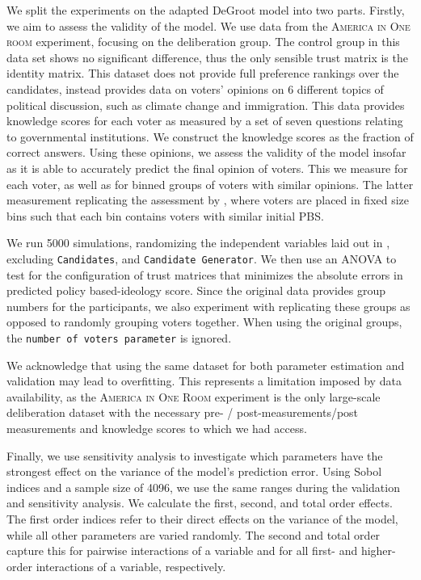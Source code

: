 We split the experiments on the adapted DeGroot model into two parts. Firstly,
we aim to assess the validity of the model. We use data from the
\textsc{America in One room} experiment, focusing on the deliberation group.
The control group in this data set shows no significant difference, thus the
only sensible trust matrix is the identity matrix. This dataset does not
provide full preference rankings over the candidates, instead provides data on
voters' opinions on 6 different topics of political discussion, such as climate
change and immigration. This data provides knowledge scores for each voter as
measured by a set of seven questions relating to governmental institutions. We
construct the knowledge scores as the fraction of correct answers. Using these
opinions, we assess the validity of the model insofar as it is able to
accurately predict the final opinion of voters. This we measure for each voter,
as well as for binned groups of voters with similar opinions. The latter
measurement replicating the assessment by
\citet{fishkinCanDeliberationHave2024}, where voters are placed in fixed size bins such that each bin contains voters with similar initial PBS.

We run 5000 simulations, randomizing the independent variables laid out in
, excluding \texttt{Candidates}, and
\texttt{Candidate Generator}. We then use an ANOVA to test for the
configuration of trust matrices that minimizes the absolute errors in predicted
policy based-ideology score. Since the original data provides group numbers for
the participants, we also experiment with
replicating these groups as opposed to randomly grouping voters together. When
using the original groups, the \texttt{number of voters parameter} is ignored.

We acknowledge that using the same dataset for both parameter estimation and
validation may lead to overfitting. This represents a limitation imposed by
data availability, as the \textsc{America in One Room} experiment is the only
large-scale deliberation dataset with the necessary pre- / post-measurements/post measurements and
knowledge scores to which we had access.





Finally, we use sensitivity analysis to investigate which parameters have the
strongest effect on the variance of the model's prediction error. Using Sobol
indices and a sample size of 4096, we use the same ranges during the validation and sensitivity analysis. We calculate the first, second, and total
order effects. The first order indices refer to their direct effects on the
variance of the model, while all other parameters are varied randomly. The second and
total order capture this for pairwise interactions of a variable and for all
first- and higher-order interactions of a variable, respectively.


